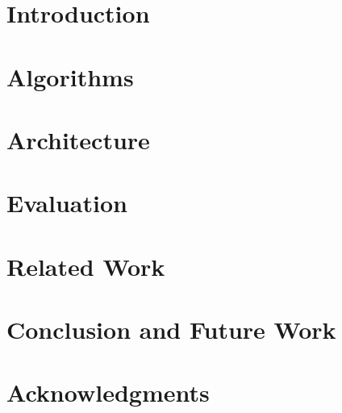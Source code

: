 \documentclass{acm_proc_article-sp}
\begin{document}
  \section{Introduction}
  \label{introduction}
  
  
  \section{Algorithms}
  \label{algorithms}
  
  
  \section{Architecture}
  \label{architecture}
  
  
  \section{Evaluation}
  \label{evaluation}
  
  
  \section{Related Work}
  \label{relatedwork}
  
  
  \section{Conclusion and Future Work}
  \label{conclusionandfuturework}
  
  
  \section{Acknowledgments}
  \label{acknowledgments}
  

  \balance

  
  
\end{document}

